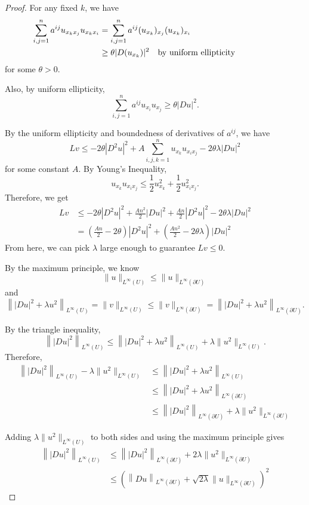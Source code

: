 \documentclass[a4paper]{article}
\begin{document}
\begin{enumerate}
\begin{proof}
      For any fixed $k$, we have
      \begin{align*}
        \sum_{i,j=1}^n a^{ij} u_{x_k x_j} u_{x_k x_i} &= \sum_{i,j=1}^n a^{ij} (u_{x_k})_{x_j} (u_{x_k})_{x_i} \\
        &\geq \theta |D(u_{x_k})|^2 \quad \parbox{5cm}{by uniform ellipticity}
      \end{align*}
      for some $\theta > 0$.

      Also, by uniform ellipticity,
      \[ \sum_{i,j=1}^n a^{ij} u_{x_i} u_{x_j} \geq \theta |Du|^2 .\]

      By the uniform ellipticity and boundedness of derivatives of $a^{ij}$, we have
      \[ Lv \leq -2 \theta |D^2 u|^2 + A \sum_{i,j,k=1}^n u_{x_k} u_{x_i x_j} - 2 \theta \lambda |Du|^2 \]
      for some constant $A$. By Young's Inequality,
      \[ u_{x_k} u_{x_i x_j} \leq \frac{1}{2} u_{x_k}^2 + \frac{1}{2} u_{x_i x_j}^2 .\]
      Therefore, we get
      \begin{align*}
        Lv &\leq -2 \theta |D^2u|^2 + \frac{A n^2}{2} |Du|^2 + \frac{A n}{2} |D^2 u|^2 - 2\theta \lambda |Du|^2 \\
        &= \left( \frac{A n}{2} - 2 \theta \right) |D^2 u|^2 + \left(\frac{A n^2}{2} - 2 \theta \lambda \right) |Du|^2
      \end{align*}
      From here, we can pick $\lambda$ large enough to guarantee $Lv \leq 0$.

      By the maximum principle, we know
      \[ \| u \|_{L^\infty(U)} \leq \| u \|_{L^\infty(\partial U)} \]
      and
      \[ \left\| |Du|^2 + \lambda u^2 \right\|_{L^\infty(U)} = \| v \|_{L^\infty(U)} \leq \| v \|_{L^\infty(\partial U)} = \left\| |Du|^2 + \lambda u^2
      \right\|_{L^\infty(\partial U)} .\]

      By the triangle inequality,
      \[ \left\| |Du|^2 \right\|_{L^\infty(U)} \leq \left\| |Du|^2 + \lambda u^2 \right\|_{L^\infty(U)} + \lambda \| u^2 \|_{L^\infty(U)} .\]
      Therefore,
      \begin{align*}
        \left\| |Du|^2 \right\|_{L^\infty(U)} - \lambda \|u^2\|_{L^\infty(U)}
        &\leq \left\| |Du|^2 + \lambda u^2 \right\|_{L^\infty(U)} \\
        &\leq \left\| |Du|^2 + \lambda u^2 \right\|_{L^\infty(\partial U)} \\
        &\leq \left\| |Du|^2 \right\|_{L^\infty(\partial U)} + \lambda \|u^2\|_{L^\infty(\partial U)}
      \end{align*}

      Adding $\lambda \|u^2\|_{L^\infty(U)}$ to both sides and using the maximum principle gives
      \begin{align*}
        \left\| |Du|^2 \right\|_{L^\infty(U)} &\leq \left\| |Du|^2 \right\|_{L^\infty(\partial U)} + 2\lambda \|u^2\|_{L^\infty(\partial U)} \\
        &\leq \left( \left\| Du \right\|_{L^\infty(\partial U)} + \sqrt{2 \lambda} \|u\|_{L^\infty(\partial U)} \right)^2
      \end{align*}


\end{proof}
\end{enumerate}
\end{document}
